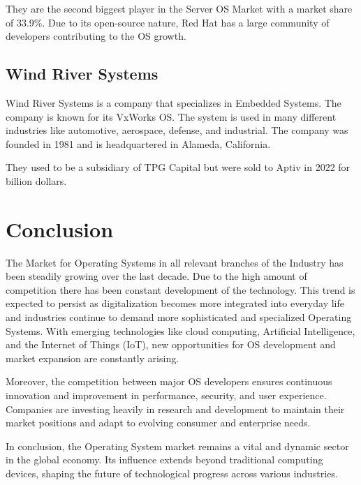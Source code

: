 They are the second biggest player in the Server OS Market with a market share of 33.9\%. 
Due to its open-source nature, Red Hat has a large community of developers contributing to the OS growth.

\cite{RedHatWiki}

\subsection{Wind River Systems}

Wind River Systems is a company that specializes in Embedded Systems. The company is known for its VxWorks OS. The system is used in many different industries like automotive, aerospace, defense, and industrial.
The company was founded in 1981 and is headquartered in Alameda, California.

They used to be a subsidiary of TPG Capital but were sold to Aptiv in 2022 for  billion dollars.

\cite{WindriverSold}


\section{Conclusion}

The Market for Operating Systems in all relevant branches of the Industry has been steadily growing over the last decade.
Due to the high amount of competition there has been constant development of the technology. 
This trend is expected to persist as digitalization becomes more integrated into everyday life and industries continue to demand more sophisticated and specialized Operating Systems. With emerging technologies like cloud computing, Artificial Intelligence, and the Internet of Things (IoT), new opportunities for OS development and market expansion are constantly arising.

Moreover, the competition between major OS developers ensures continuous innovation and improvement in performance, security, and user experience. Companies are investing heavily in research and development to maintain their market positions and adapt to evolving consumer and enterprise needs.

In conclusion, the Operating System market remains a vital and dynamic sector in the global economy. Its influence extends beyond traditional computing devices, shaping the future of technological progress across various industries.

\author{Florian Prandstetter}
